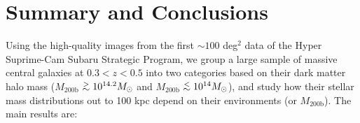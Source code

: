 \documentclass[a4paper,fleqn,usenatbib]{mnras}
\def\simlt{\lower.5ex\hbox{$\; \buildrel < \over {\sim} \;$}}
\def\simgt{\lower.5ex\hbox{$\; \buildrel > \over {\sim} \;$}}
\def\mhalo{{$M_{\mathrm{200b}}$}}
\begin{document}
\section{Summary and Conclusions}
    \label{sec:summary}
    
    Using the high-quality images from the first $\sim100$ deg$^2$ data of the 
    Hyper Suprime-Cam Subaru Strategic Program, we group a large sample of massive 
    central galaxies at $0.3 < z < 0.5$ into two categories based on their dark matter
    halo mass (\mhalo{}$\simgt 10^{14.2} M_{\odot}$ and 
    \mhalo{}$\simlt 10^{14} M_{\odot}$), and study how their stellar mass distributions 
    out to 100 kpc depend on their environments (or \mhalo{}). 
    The main results are:  
    
\end{document}
